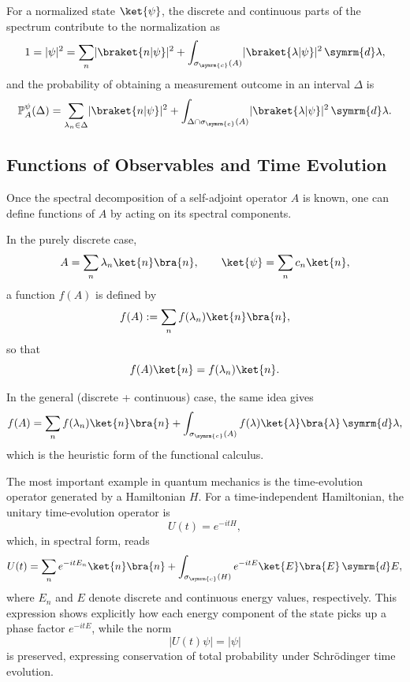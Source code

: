 For a normalized state $\ket{\psi}$, the discrete and continuous parts of the spectrum contribute to the normalization as
\begin{equation}
1=\lvert\psi\rvert^2=\sum_n\lvert\braket{n\vert\psi}\rvert^2+\int_{\sigma_{\symrm{c}}(A)}\lvert\braket{\lambda\vert\psi}\rvert^2\,\symrm{d}\lambda,
\end{equation}
and the probability of obtaining a measurement outcome in an interval $\Delta$ is
\begin{equation}
\mathbb P_A^\psi(\Delta)=\sum_{\lambda_n\in\Delta}\lvert\braket{n\vert\psi}\rvert^2+\int_{\Delta\cap\sigma_{\symrm{c}}(A)}\lvert\braket{\lambda\vert\psi}\rvert^2\,\symrm{d}\lambda.
\end{equation}
\subsection{Functions of Observables and Time Evolution}\label{sec:functions_of_observables_and_time_evolution}
Once the spectral decomposition of a self-adjoint operator $A$ is known, one can define functions of $A$ by acting on its spectral components.

In the purely discrete case,
\begin{equation}
A=\sum_n\lambda_n\ket{n}\bra{n},\qquad\ket{\psi}=\sum_n c_n\ket{n},
\end{equation}
a function $f(A)$ is defined by
\begin{equation}
f(A):=\sum_n f(\lambda_n)\ket{n}\bra{n},
\end{equation}
so that
\begin{equation}
f(A)\ket{n}=f(\lambda_n)\ket{n}.
\end{equation}

In the general (discrete + continuous) case, the same idea gives
\begin{equation}
f(A)=\sum_n f(\lambda_n)\ket{n}\bra{n}+\int_{\sigma_{\symrm{c}}(A)}f(\lambda)\ket{\lambda}\bra{\lambda}\,\symrm{d}\lambda,
\end{equation}
which is the heuristic form of the functional calculus. 

The most important example in quantum mechanics is the time-evolution operator generated by a Hamiltonian $H$. For a time-independent Hamiltonian, the unitary time-evolution operator is
\begin{equation}
U(t)=e^{-i t H},
\end{equation}
which, in spectral form, reads
\begin{equation}
U(t)=\sum_n e^{-i t E_n} \ket{n}\bra{n}+\int_{\sigma_{\symrm{c}}(H)}e^{-i t E}\ket{E}\bra{E}\,\symrm{d}E,
\end{equation}
where $E_n$ and $E$ denote discrete and continuous energy values, respectively. This expression shows explicitly how each energy component of the state picks up a phase factor $e^{-i t E}$, while the norm
\begin{equation}
\lvert U(t)\psi\rvert=\lvert\psi\rvert
\end{equation}
is preserved, expressing conservation of total probability under Schr\"odinger time evolution.
